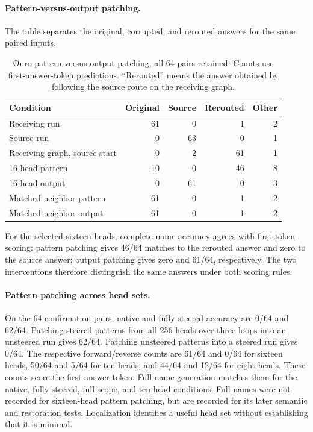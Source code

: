 \documentclass{article}
\begin{document}
\paragraph{Pattern-versus-output patching.}
The table separates the original, corrupted, and rerouted answers for the same paired inputs.
\begin{table}[!htbp]\centering
\caption{Ouro pattern-versus-output patching, all 64 pairs retained. Counts use first-answer-token predictions. ``Rerouted'' means the answer obtained by following the source route on the receiving graph.}
\begin{tabular}{@{}lrrrr@{}}\toprule
Condition & Original & Source & Rerouted & Other\\\midrule
Receiving run & 61 & 0 & 1 & 2 \\
Source run & 0 & 63 & 0 & 1 \\
Receiving graph, source start & 0 & 2 & 61 & 1 \\
16-head pattern & 10 & 0 & 46 & 8 \\
16-head output & 0 & 61 & 0 & 3 \\
Matched-neighbor pattern & 61 & 0 & 1 & 2 \\
Matched-neighbor output & 61 & 0 & 1 & 2 \\
\bottomrule\end{tabular}\end{table}

For the selected sixteen heads, complete-name accuracy agrees with first-token scoring: pattern patching gives 46/64 matches to the rerouted answer and zero to the source answer; output patching gives zero and 61/64, respectively. The two interventions therefore distinguish the same answers under both scoring rules.

\paragraph{Pattern patching across head sets.}
On the 64 confirmation pairs, native and fully steered accuracy are 0/64 and 62/64. Patching steered patterns from all 256 heads over three loops into an unsteered run gives 62/64. Patching unsteered patterns into a steered run gives 0/64. The respective forward/reverse counts are 61/64 and 0/64 for sixteen heads, 50/64 and 5/64 for ten heads, and 44/64 and 12/64 for eight heads. These counts score the first answer token. Full-name generation matches them for the native, fully steered, full-scope, and ten-head conditions. Full names were not recorded for sixteen-head pattern patching, but are recorded for its later semantic and restoration tests. Localization identifies a useful head set without establishing that it is minimal.
\end{document}
